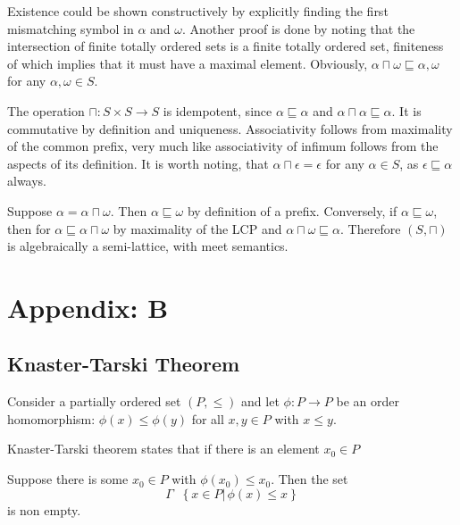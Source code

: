 \documentclass[a4paper]{article}
\newcommand{\obj}[1]{{\left\{ #1 \right \}}}
\newcommand{\induc}[1]{{\left . #1 \right \vert}}
\newcommand{\defn}{\mathop{\overset{\Delta}{=}}\nolimits}
\begin{document}
Existence could be shown constructively by explicitly finding the first mismatching symbol in $\alpha$ and $\omega$. Another proof is done by noting that the intersection of finite totally ordered sets is a finite totally ordered set, finiteness of which implies that it must have a maximal element. Obviously, $\alpha\sqcap \omega\sqsubseteq \alpha,\omega$ for any $\alpha,\omega\in S$. 

The operation $\sqcap:S\times S\to S$ is idempotent, since $\alpha\sqsubseteq\alpha$ and $\alpha\sqcap \alpha \sqsubseteq \alpha$. It is commutative by definition and uniqueness. Associativity follows from maximality of the common prefix, very much like associativity of infimum follows from the aspects of its definition. It is worth noting, that $\alpha\sqcap \epsilon = \epsilon$ for any $\alpha\in S$, as $\epsilon\sqsubseteq \alpha$ always.

Suppose $\alpha = \alpha\sqcap\omega$. Then $\alpha\sqsubseteq \omega$ by definition of a prefix. Conversely, if $\alpha\sqsubseteq \omega$, then for $\alpha\sqsubseteq \alpha\sqcap\omega$ by maximality of the LCP and $\alpha\sqcap\omega\sqsubseteq\alpha$. Therefore $(S,\sqcap)$ is algebraically a semi-lattice, with meet semantics.






\section{Appendix: B} %
\label{sec:appendix_b}

\subsection{Knaster-Tarski Theorem} %
\label{sub:knaster_tarski_theorem}

Consider a partially ordered set $(P,\leq)$ and let $\phi:P\to P$ be an order homomorphism: $\phi(x) \leq \phi(y)$ for all $x,y\in P$ with $x\leq y$.

Knaster-Tarski theorem states that if there is an element $x_0\in P$

Suppose there is some $x_0\in P$ with $\phi(x_0)\leq x_0$. Then the set \[\Gamma \defn \obj{ \induc{x\in P}\,\phi(x)\leq x}\] is non empty.
\end{document}
